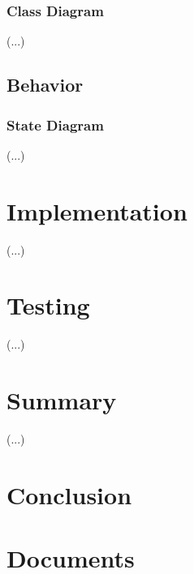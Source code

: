 \documentclass[12pt,a4paper,titlepage]{article}
\begin{document}
				\subsubsection{Class Diagram}
(...)
			\subsection{Behavior}
				\subsubsection{State Diagram}
(...)

		\section{Implementation}
(...)
		\section{Testing}
(...)
		\section{Summary}
(...)
		\section{Conclusion}

	\printbibheading
	\printbibliography[type=book,heading=subbibliography,title={Book Sources}]
	\printbibliography[nottype=book,heading=subbibliography,title={Other Sources}]	

	\appendix
			\section{Documents}
\end{document}
